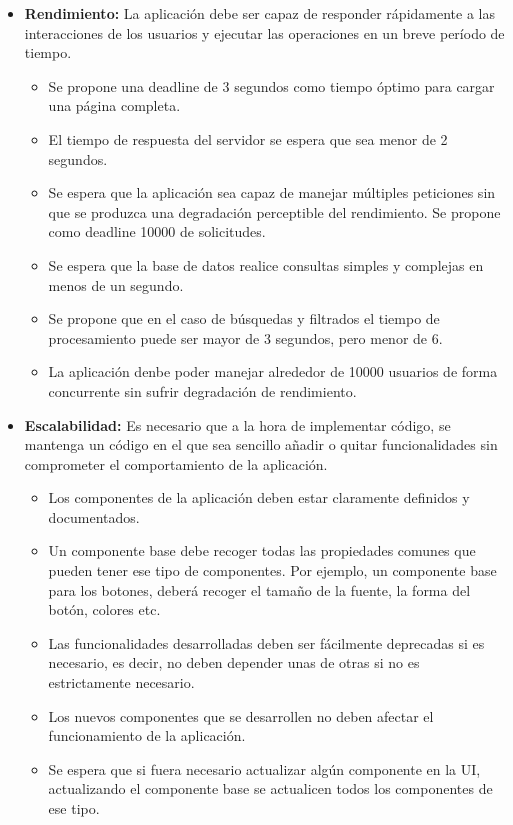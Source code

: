 \documentclass[a4paper, 12pt]{article}
\begin{document}
\begin{itemize}[noitemsep]
	\item \textbf{Rendimiento:} La aplicación debe ser capaz de responder rápidamente a las interacciones de los usuarios y ejecutar las operaciones en un breve período de tiempo. 
		\begin{itemize}[noitemsep]
			\item Se propone una deadline de 3 segundos como tiempo óptimo para cargar una página completa.
			\item El tiempo de respuesta del servidor se espera que sea menor de 2 segundos.
			\item Se espera que la aplicación sea capaz de manejar múltiples peticiones sin que se produzca una degradación perceptible del rendimiento. Se propone como deadline 10000 de solicitudes.
			\item Se espera que la base de datos realice consultas simples y complejas en menos de un segundo.
			\item Se propone que en el caso de búsquedas y filtrados el tiempo de procesamiento puede ser mayor de 3 segundos, pero menor de 6.
			\item La aplicación denbe poder manejar alrededor de 10000 usuarios de forma concurrente sin sufrir degradación de rendimiento.
		\end{itemize}
	\item \textbf{Escalabilidad:} Es necesario que a la hora de implementar código, se mantenga un código en el que sea sencillo añadir o quitar funcionalidades sin comprometer el comportamiento de la aplicación.
		\begin{itemize}[noitemsep]
			\item Los componentes de la aplicación deben estar claramente definidos y documentados.
			\item Un componente base debe recoger todas las propiedades comunes que pueden tener ese tipo de componentes. Por ejemplo, un componente base para los botones, deberá recoger el tamaño de la fuente, la forma del botón, colores etc.
			\item Las funcionalidades desarrolladas deben ser fácilmente deprecadas si es necesario, es decir, no deben depender unas de otras si no es estrictamente necesario.
			\item Los nuevos componentes que se desarrollen no deben afectar el funcionamiento de la aplicación.
			\item Se espera que si fuera necesario actualizar algún componente en la UI, actualizando el componente base se actualicen todos los componentes de ese tipo.

\end{itemize}
\end{itemize}
\end{document}
